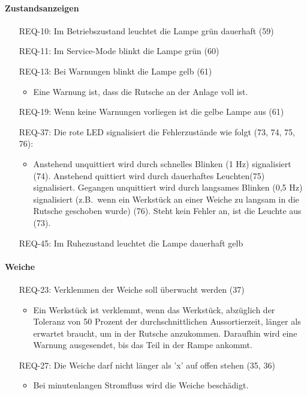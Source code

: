 \paragraph{Zustandsanzeigen}
\begin{itemize}
    \item[REQ-10:] Im Betriebszustand leuchtet die Lampe grün dauerhaft (59)
    \item[REQ-11:] Im Service-Mode blinkt die Lampe grün (60)
    \item[REQ-13:] Bei Warnungen blinkt die Lampe gelb (61)
    \begin{itemize}
        \item Eine Warnung ist, dass die Rutsche an der Anlage voll ist.
    \end{itemize}
    \item[REQ-19:] Wenn keine Warnungen vorliegen ist die gelbe Lampe aus (61)
    \item[REQ-37:] Die rote LED signalisiert die Fehlerzustände wie folgt (73, 74, 75, 76):
    \begin{itemize}
        \item Anstehend unquittiert wird durch schnelles Blinken (1 Hz) signalisiert (74).
        Anstehend quittiert wird durch dauerhaftes Leuchten(75) signalisiert.
        Gegangen unquittiert wird durch langsames Blinken (0,5 Hz) signalisiert (z.B.\ wenn ein
        Werkstück an einer Weiche zu langsam in die Rutsche geschoben wurde) (76).
        Steht kein Fehler an, ist die Leuchte aus (73).
    \end{itemize}
    \item[REQ-45:] Im Ruhezustand leuchtet die Lampe dauerhaft gelb
\end{itemize}

\paragraph{Weiche}
\begin{itemize}
    \item[REQ-23:] Verklemmen der Weiche soll überwacht werden (37)
    \begin{itemize}
        \item Ein Werkstück ist verklemmt, wenn das Werkstück, abzüglich der Toleranz von 50 Prozent
        der durchschnittlichen Aussortierzeit, länger als erwartet braucht, um in der Rutsche anzukommen.
        Daraufhin wird eine Warnung ausgesendet, bis das Teil in der Rampe ankommt.
    \end{itemize}
    \item[REQ-27:] Die Weiche darf nicht länger als 'x' auf offen stehen (35, 36)
    \begin{itemize}
        \item Bei minutenlangen Stromfluss wird die Weiche beschädigt.
    \end{itemize}
\end{itemize}

